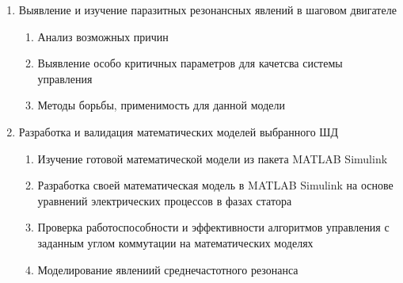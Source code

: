 \begin{enumerate}
    \item{Выявление и изучение паразитных резонансных явлений в шаговом двигателе}
        \begin{enumerate}
            \item Анализ возможных причин
            \item Выявление особо критичных параметров для качетсва системы управления
            \item Методы борьбы, применимость для данной модели
        \end{enumerate}

    \item{Разработка и валидация математических моделей выбранного ШД}
        \begin{enumerate}
            \item Изучение готовой математической модели из пакета MATLAB Simulink
            \item Разработка своей математическая модель в MATLAB Simulink на основе
                    уравнений электрических процессов в фазах статора
            \item Проверка работоспособности и эффективности алгоритмов управления с заданным углом
                    коммутации на математических моделях
            \item Моделирование явлениий среднечастотного резонанса
        \end{enumerate}
\end{enumerate}
